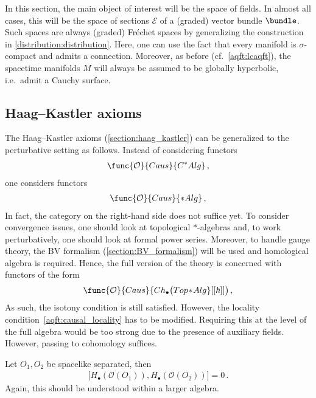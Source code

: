     In this section, the main object of interest will be the space of fields. In almost all cases, this will be the space of sections $\mathcal{E}$ of a (graded) vector bundle $\bundle$. Such spaces are always (graded) Fr\'echet spaces by generalizing the construction in \cref{distribution:distribution}. Here, one can use the fact that every manifold is $\sigma$-compact and admits a connection. Moreover, as before (cf.~\cref{aqft:lcaqft}), the spacetime manifolds $M$ will always be assumed to be globally hyperbolic, i.e.~admit a Cauchy surface.

\subsection{Haag--Kastler axioms}

    The Haag--Kastler axioms (\cref{section:haag_kastler}) can be generalized to the perturbative setting as follows. Instead of considering functors
    \begin{gather}
        \func{\mathcal{O}}{Caus}{C^*Alg}\,,
    \end{gather}
    one considers functors
    \begin{gather}
        \func{\mathcal{O}}{Caus}{\ast Alg}\,,
    \end{gather}
    In fact, the category on the right-hand side does not suffice yet. To consider convergence issues, one should look at topological $\ast$-algebras and, to work perturbatively, one should look at formal power series. Moreover, to handle gauge theory, the BV formalism (\cref{section:BV_formalism}) will be used and homological algebra is required. Hence, the full version of the theory is concerned with functors of the form
    \begin{gather}
        \func{\mathcal{O}}{Caus}{Ch_\bullet\bigl(Top\!\ast\!Alg}[[\hbar]]\bigr)\,,
    \end{gather}
    As such, the isotony condition is still satisfied. However, the locality condition~\eqref{aqft:causal_locality} has to be modified. Requiring this at the level of the full algebra would be too strong due to the presence of auxiliary fields. However, passing to cohomology suffices.
    \begin{axiom}
        Let $O_1,O_2$ be spacelike separated, then
        \begin{gather}
            \bigl[H_\bullet(\mathcal{O}(O_1)),H_\bullet(\mathcal{O}(O_2))\bigr] = 0\,.
        \end{gather}
        Again, this should be understood within a larger algebra.
    \end{axiom}

